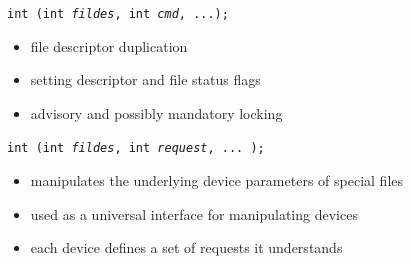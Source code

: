 

\begin{slide}
 \texttt{int (int \emph{fildes}, int
\emph{cmd}, ...);}
\begin{itemize}
\item file descriptor duplication
\item setting descriptor and file status flags
\item advisory and possibly mandatory locking
\end{itemize}

\texttt{int (int \emph{fildes}, int \emph{request}, ... );}
\begin{itemize}
\item manipulates the underlying device parameters of special files
\item used as a universal interface for manipulating devices
\item each device defines a set of requests it understands
\end{itemize}
\end{slide}

\label{FCNTL}

